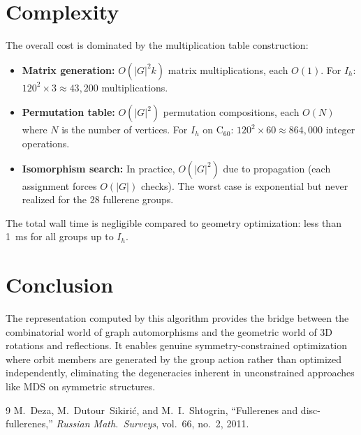\documentclass[11pt]{article}
\begin{document}
\section{Complexity}
\label{sec:complexity}

The overall cost is dominated by the multiplication table construction:

\begin{itemize}
  \item \textbf{Matrix generation:} $O(|G|^2 k)$ matrix multiplications,
    each $O(1)$.  For $I_h$: $120^2 \times 3 \approx 43{,}200$
    multiplications.
  \item \textbf{Permutation table:} $O(|G|^2)$ permutation compositions,
    each $O(N)$ where $N$ is the number of vertices.  For $I_h$ on
    C$_{60}$: $120^2 \times 60 \approx 864{,}000$ integer operations.
  \item \textbf{Isomorphism search:} In practice, $O(|G|^2)$ due to
    propagation (each assignment forces $O(|G|)$ checks).  The worst
    case is exponential but never realized for the 28 fullerene groups.
\end{itemize}

The total wall time is negligible compared to geometry optimization:
less than 1~ms for all groups up to $I_h$.

\section{Conclusion}

The representation computed by this algorithm provides the bridge
between the combinatorial world of graph automorphisms and the geometric
world of 3D rotations and reflections.  It enables genuine
symmetry-constrained optimization where orbit members are generated by
the group action rather than optimized independently, eliminating the
degeneracies inherent in unconstrained approaches like MDS on symmetric
structures.

\begin{thebibliography}{9}
  M.~Deza, M.~Dutour~Sikiri{\'c}, and M.~I.~Shtogrin,
  ``Fullerenes and disc-fullerenes,''
  \emph{Russian Math.\ Surveys}, vol.~66, no.~2, 2011.
\end{thebibliography}
\end{document}
